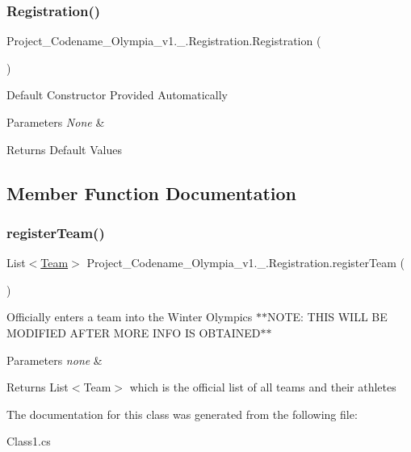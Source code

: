\subsubsection{\texorpdfstring{Registration()}{Registration()}}
{\footnotesize\ttfamily Project\+\_\+\+Codename\+\_\+\+Olympia\+\_\+v1.\+\_.\+Registration.\+Registration (\begin{DoxyParamCaption}{ }\end{DoxyParamCaption})\hspace{0.3cm}{\ttfamily [inline]}}

Default Constructor Provided Automatically 
\begin{DoxyParams}{Parameters}
{\em None} & \\
\hline
\end{DoxyParams}
\begin{DoxyReturn}{Returns}
Default Values 
\end{DoxyReturn}


\subsection{Member Function Documentation}
\mbox{\label{classProject__Codename__Olympia__v1_1_1__0_1_1Registration_a44b2f6bdcf9dbd46d155af0c8bafa2ae}} 
\subsubsection{\texorpdfstring{register\+Team()}{registerTeam()}}
{\footnotesize\ttfamily List$<$\hyperlink{classProject__Codename__Olympia__v1_1_1__0_1_1Team}{Team}$>$ Project\+\_\+\+Codename\+\_\+\+Olympia\+\_\+v1.\+\_.\+Registration.\+register\+Team (\begin{DoxyParamCaption}{ }\end{DoxyParamCaption})\hspace{0.3cm}{\ttfamily [inline]}}

Officially enters a team into the Winter Olympics $\ast$$\ast$\+N\+O\+TE\+: T\+H\+IS W\+I\+LL BE M\+O\+D\+I\+F\+I\+ED A\+F\+T\+ER M\+O\+RE I\+N\+FO IS O\+B\+T\+A\+I\+N\+E\+D$\ast$$\ast$ 
\begin{DoxyParams}{Parameters}
{\em none} & \\
\hline
\end{DoxyParams}
\begin{DoxyReturn}{Returns}
List$<$\+Team$>$ which is the official list of all teams and their athletes 
\end{DoxyReturn}


The documentation for this class was generated from the following file\+:\begin{DoxyCompactItemize}
\item 
Class1.\+cs\end{DoxyCompactItemize}
